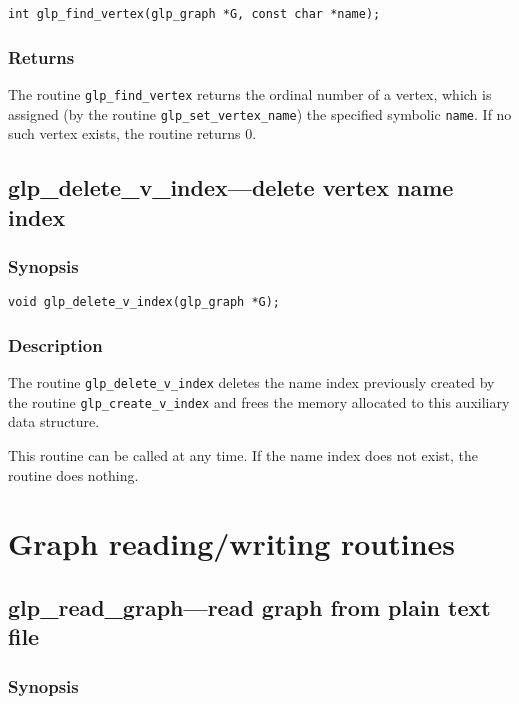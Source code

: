 \begin{verbatim}
int glp_find_vertex(glp_graph *G, const char *name);
\end{verbatim}

\subsubsection*{Returns}

The routine \verb|glp_find_vertex| returns the ordinal number of
a vertex, which is assigned (by the routine \verb|glp_set_vertex_name|)
the specified symbolic \verb|name|. If no such vertex exists, the
routine returns 0.

\subsection{glp\_delete\_v\_index---delete vertex name index}

\subsubsection*{Synopsis}

\begin{verbatim}
void glp_delete_v_index(glp_graph *G);
\end{verbatim}

\subsubsection*{Description}

The routine \verb|glp_delete_v_index| deletes the name index previously
created by the routine \verb|glp_create_v_index| and frees the memory
allocated to this auxiliary data structure.

This routine can be called at any time. If the name index does not
exist, the routine does nothing.

\newpage

\section{Graph reading/writing routines}

\subsection{glp\_read\_graph---read graph from plain text file}

\subsubsection*{Synopsis}

